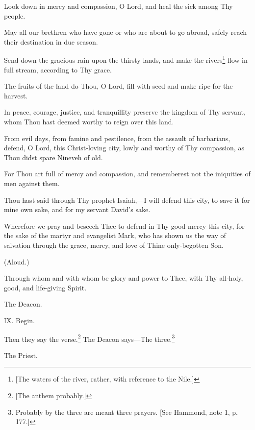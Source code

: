 Look down in mercy and compassion, O Lord, and heal the sick among Thy people.

May all our brethren who have gone or who are about to go abroad, safely reach their destination in due season.

Send down the gracious rain upon the thirsty lands, and make the rivers\footnote{\par{}  [The waters of the river, rather, with reference to the Nile.]} flow in full stream, according to Thy grace.

The fruits of the land do Thou, O Lord, fill with seed and make ripe for the harvest.

In peace, courage, justice, and tranquillity preserve the kingdom of Thy servant, whom Thou hast deemed worthy to reign over this land.

From evil days, from famine and pestilence, from the assault of barbarians, defend, O Lord, this Christ-loving city, lowly and worthy of Thy compassion, as Thou didst spare Nineveh of old.

For Thou art full of mercy and compassion, and rememberest not the iniquities of men against them.

Thou hast said through Thy prophet Isaiah,—I will defend this city, to save it for mine own sake, and for my servant David’s sake.

Wherefore we pray and beseech Thee to defend in Thy good mercy this city, for the sake of the martyr and evangelist Mark, who has shown us the way of salvation through the grace, mercy, and love of Thine only-begotten Son.

(Aloud.)

Through whom and with whom be glory and power to Thee, with Thy all-holy, good, and life-giving Spirit.

The Deacon.

IX. Begin.

Then they say the verse.\footnote{\par{}  [The anthem probably.]} The Deacon says—The three.\footnote{\par  Probably by the three are meant three prayers. [See Hammond, note 1, p. 177.]}

The Priest.

